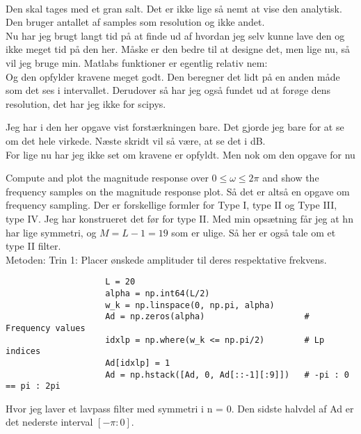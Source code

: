 \begin{Opgaver}
\begin{kapitel}
\begin{Opgave}
\begin{UnderOpgave}
                \\
                Den skal tages med et gran salt. Det er ikke lige så nemt at vise den analytisk.
                Den bruger antallet af samples som resolution og ikke andet.\\
                Nu har jeg brugt langt tid på at finde ud af hvordan jeg selv kunne lave den og ikke meget tid på den her. 
                Måske er den bedre til at designe det, men lige nu, så vil jeg bruge min. 
                Matlabs funktioner er egentlig relativ nem: \\
                Og den opfylder kravene meget godt. 
                Den beregner det lidt på en anden måde som det ses i intervallet. Derudover så har jeg også fundet ud at forøge dens resolution, det har jeg ikke for scipys.\\
            \end{UnderOpgave}
            Jeg har i den her opgave vist forstærkningen bare. Det gjorde jeg bare for at se om det hele virkede. Næste skridt vil så være, at se det i dB. \\
            For lige nu har jeg ikke set om kravene er opfyldt. Men nok om den opgave for nu 
        \end{Opgave}
        \begin{Opgave}[Opgave 10.11 - Consider an ideal lowpass filter with cutoff frequency \text{$w_c = \pi/2$}]
            \begin{UnderOpgave}[Using L = 20 samples around the unit circle, compute the resulting impulse response hn using the rectangular window.]
                Compute and plot the magnitude response over $0 \leq \omega \leq 2\pi$ and show the frequency samples on the magnitude response plot. 
                Så det er altså en opgave om frequency sampling. 
                Der er forskellige formler for Type I, type II og Type III, type IV. Jeg har konstrueret det før for type II. 
                Med min opsætning får jeg at hn har lige symmetri, og $M = L - 1 = 19$ som er ulige. Så her er også tale om et type II filter. \\

                Metoden: 
                Trin 1: Placer ønskede amplituder til deres respektative frekvens.
                \begin{verbatim}
                    L = 20
                    alpha = np.int64(L/2)
                    w_k = np.linspace(0, np.pi, alpha)
                    Ad = np.zeros(alpha)                    # Frequency values
                    idxlp = np.where(w_k <= np.pi/2)        # Lp indices 
                    Ad[idxlp] = 1
                    Ad = np.hstack([Ad, 0, Ad[::-1][:9]])   # -pi : 0 == pi : 2pi
                \end{verbatim}
                Hvor jeg laver et lavpass filter med symmetri i n = 0. Den sidste halvdel af Ad er det nederste interval $[-\pi: 0]$. \\
                

\end{UnderOpgave}
\end{Opgave}
\end{kapitel}
\end{Opgaver}
